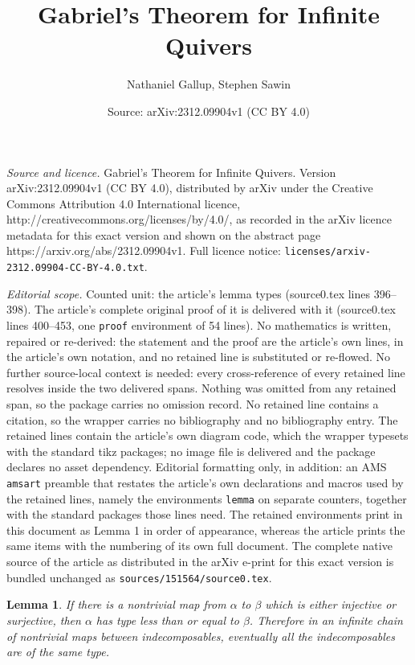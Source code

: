 \documentclass[10pt,a4paper]{amsart}
\title{Gabriel's Theorem for Infinite Quivers}
\author{Nathaniel Gallup, Stephen Sawin}
\date{Source: arXiv:2312.09904v1 (CC BY 4.0)}
\newtheorem{lemma}{Lemma}
\begin{document}
\maketitle

\noindent\emph{Source and licence.} Gabriel's Theorem for Infinite Quivers. Version arXiv:2312.09904v1 (CC BY 4.0), distributed by arXiv under the Creative Commons Attribution 4.0 International licence, http://creativecommons.org/licenses/by/4.0/, as recorded in the arXiv licence metadata for this exact version and shown on the abstract page https://arxiv.org/abs/2312.09904v1. Full licence notice: \texttt{licenses/arxiv-2312.09904-CC-BY-4.0.txt}.\par\smallskip

\noindent\textit{Editorial scope.} Counted unit: the article's lemma types (source0.tex lines 396--398). The article's complete original proof of it is delivered with it (source0.tex lines 400--453, one \texttt{proof} environment of 54 lines). No mathematics is written, repaired or re-derived: the statement and the proof are the article's own lines, in the article's own notation, and no retained line is substituted or re-flowed.  No further source-local context is needed: every cross-reference of every retained line resolves inside the two delivered spans.  Nothing was omitted from any retained span, so the package carries no omission record.  No retained line contains a citation, so the wrapper carries no bibliography and no bibliography entry.  The retained lines contain the article's own diagram code, which the wrapper typesets with the standard tikz packages; no image file is delivered and the package declares no asset dependency.  Editorial formatting only, in addition: an AMS \texttt{amsart} preamble that restates the article's own declarations and macros used by the retained lines, namely the environments \texttt{lemma} on separate counters, together with the standard packages those lines need.  The retained environments print in this document as Lemma 1 in order of appearance, whereas the article prints the same items with the numbering of its own full document.  The complete native source of the article as distributed in the arXiv e-print for this exact version is bundled unchanged as \texttt{sources/151564/source0.tex}.
\begin{lemma}\label{lm: ordering among types}
    If there is a nontrivial map from $\alpha$ to $\beta$ which is either injective or surjective, then $\alpha$ has type less than or equal to $\beta$. Therefore in an infinite chain of nontrivial maps between indecomposables, eventually all the indecomposables are of the same type.  
\end{lemma}
\end{document}
